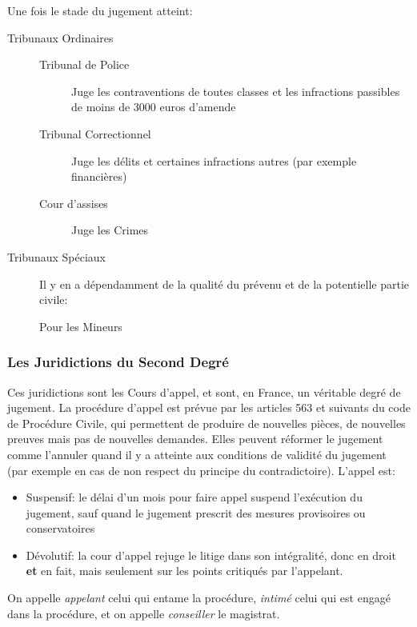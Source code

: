 \documentclass[math]{cours}
\begin{document}
Une fois le stade du jugement atteint:
\begin{description}
	\item[Tribunaux Ordinaires] \begin{description}
		      \item[Tribunal de Police] Juge les contraventions de toutes classes et les infractions passibles de moins de 3000 euros d'amende
		      \item[Tribunal Correctionnel] Juge les délits et certaines infractions autres (par exemple financières)
		      \item[Cour d'assises] Juge les Crimes
	      \end{description}
	\item[Tribunaux Spéciaux] Il y en a dépendamment de la qualité du prévenu et de la potentielle partie civile:
	      \begin{description}
		      \item[Pour les Mineurs]
	      \end{description}
\end{description}

\subsubsection{Les Juridictions du Second Degré}
Ces juridictions sont les Cours d'appel, et sont, en France, un véritable degré de jugement.
La procédure d'appel est prévue par les articles 563 et suivants du code de Procédure Civile, qui permettent de produire de nouvelles pièces, de nouvelles preuves mais pas de nouvelles demandes.
Elles peuvent réformer le jugement comme l'annuler quand il y a atteinte aux conditions de validité du jugement (par exemple en cas de non respect du principe du contradictoire).
L'appel est:
\begin{itemize}
	\item Suspensif:
	      le délai d'un mois pour faire appel suspend l'exécution du jugement, sauf quand le jugement prescrit des mesures provisoires ou conservatoires
	\item Dévolutif:
	      la cour d'appel rejuge le litige dans son intégralité, donc en droit \textbf{et} en fait, mais seulement sur les points critiqués par l'appelant.
\end{itemize}
On appelle \emph{appelant} celui qui entame la procédure, \emph{intimé} celui qui est engagé dans la procédure, et on appelle \emph{conseiller} le magistrat.
\end{document}
